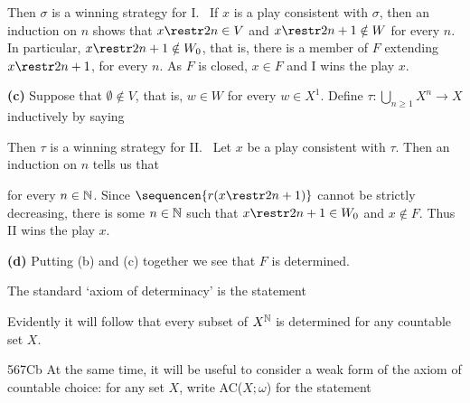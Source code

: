 {\noindent Then $\sigma$ is a winning strategy for I.   \Prf\ If
$x$ is a play consistent with $\sigma$, then an induction on $n$ shows that
$x\restr 2n\in V$ and $x\restr 2n+1\notin W$ for every $n$.   In
particular, $x\restr 2n+1\notin W_0$, that is, there is a member of $F$
extending $x\restr 2n+1$, for every $n$.   As $F$ is closed, $x\in F$ and I
wins the play $x$.\ \Qed

\medskip

{\bf (c)} Suppose that $\emptyset\notin V$, that is, $w\in W$ for every
$w\in X^1$.   Define
$\tau:\bigcup_{n\ge 1}X^n\to X$ inductively by saying


\noindent Then $\tau$ is a winning strategy for II.   \Prf\ Let $x$ be a
play consistent with $\tau$.   Then an induction on $n$ tells us that


\noindent for every $n\in\Bbb N$.  Since $\sequencen{r(x\restr 2n+1)}$
cannot be strictly decreasing, there is some $n\in\Bbb N$ such that
$x\restr 2n+1\in W_0$ and $x\notin F$.   Thus II wins the play $x$.\ \Qed

\medskip

{\bf (d)} Putting (b) and (c) together we see that $F$ is determined.
}%

The standard `axiom of determinacy' is the statement


\noindent Evidently it will follow that every subset of $X^{\Bbb N}$ is
determined for any countable set $X$.  

\spheader 567Cb At the same time, it will be useful to consider a weak form
of the axiom of countable choice:   for any set $X$, write
AC($X;\omega$) for the statement

